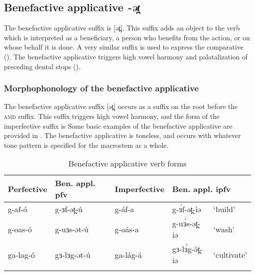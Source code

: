 



\subsection{Benefactive applicative \textit{-ət̪}}\label{sec:ch11:benappl}

The benefactive applicative suffix is [ət̪].  This suffix adds an object to the verb which is interpreted as a beneficiary, a person who benefits from the action, or on whose behalf it is done. A very similar suffix is used to express the comparative (). The benefactive applicative triggers high vowel harmony and palatalization of preceding dental stops ().

\subsubsection{Morphophonology of the benefactive applicative}

The benefactive applicative suffix [ət̪] occurs as a suffix on the root before the \textsc{amd} suffix. This suffix triggers high vowel harmony, and the form of the imperfective suffix is  Some basic examples of the benefactive applicative are provided in . The benefactive applicative is toneless, and occurs with whatever tone pattern is specified for the macrostem as a whole.

\begin{table}
\begin{tabular}[t]{lllll}
\lsptoprule
Perfective	& 	Ben. appl. pfv 	& Imperfective & \multicolumn{2}{l}{Ben. appl. ipfv} 	 \\
\midrule
g-af-ó			&	g-ɜf-ət̪-ú		&	g-áf-a		&	g-ɜ́f-ət̪-iə			& `build'\\%
g-oas-ó			& 	g-uɜs-ət-ú		& 	g-oás-a		& 	g-uɜ́s-ət̪-iə 	& ‘wash’	\\
ga-lag-ó		&	gɜ-lɜg-ət-ú		& 	ga-lág-á	&	gɜ-lɜ́g-ə́t̪-iə 	& ‘cultivate’\\ 
\lspbottomrule
\end{tabular}
\caption{Benefactive applicative verb forms} \label{tab:ch11:appl}    
\end{table}  

